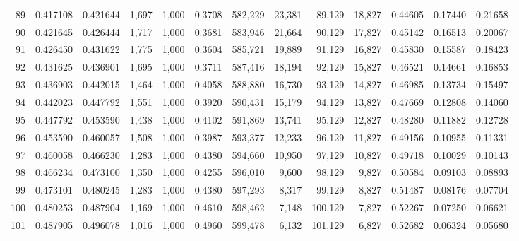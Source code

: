 \begin{tabular}{rrrrrrrrrrrrr}
89  &  0.417108 &  0.421644 &   1,697 &  1,000 &                                     0.3708 &  582,229 &   23,381 &   89,129 &   18,827 &  0.44605 &  0.17440 &  0.21658 \\
90  &  0.421645 &  0.426444 &   1,717 &  1,000 &                                     0.3681 &  583,946 &   21,664 &   90,129 &   17,827 &  0.45142 &  0.16513 &  0.20067 \\
91  &  0.426450 &  0.431622 &   1,775 &  1,000 &                                     0.3604 &  585,721 &   19,889 &   91,129 &   16,827 &  0.45830 &  0.15587 &  0.18423 \\
92  &  0.431625 &  0.436901 &   1,695 &  1,000 &                                     0.3711 &  587,416 &   18,194 &   92,129 &   15,827 &  0.46521 &  0.14661 &  0.16853 \\
93  &  0.436903 &  0.442015 &   1,464 &  1,000 &                                     0.4058 &  588,880 &   16,730 &   93,129 &   14,827 &  0.46985 &  0.13734 &  0.15497 \\
94  &  0.442023 &  0.447792 &   1,551 &  1,000 &                                     0.3920 &  590,431 &   15,179 &   94,129 &   13,827 &  0.47669 &  0.12808 &  0.14060 \\
95  &  0.447792 &  0.453590 &   1,438 &  1,000 &                                     0.4102 &  591,869 &   13,741 &   95,129 &   12,827 &  0.48280 &  0.11882 &  0.12728 \\
96  &  0.453590 &  0.460057 &   1,508 &  1,000 &                                     0.3987 &  593,377 &   12,233 &   96,129 &   11,827 &  0.49156 &  0.10955 &  0.11331 \\
97  &  0.460058 &  0.466230 &   1,283 &  1,000 &                                     0.4380 &  594,660 &   10,950 &   97,129 &   10,827 &  0.49718 &  0.10029 &  0.10143 \\
98  &  0.466234 &  0.473100 &   1,350 &  1,000 &                                     0.4255 &  596,010 &    9,600 &   98,129 &    9,827 &  0.50584 &  0.09103 &  0.08893 \\
99  &  0.473101 &  0.480245 &   1,283 &  1,000 &                                     0.4380 &  597,293 &    8,317 &   99,129 &    8,827 &  0.51487 &  0.08176 &  0.07704 \\
100 &  0.480253 &  0.487904 &   1,169 &  1,000 &                                     0.4610 &  598,462 &    7,148 &  100,129 &    7,827 &  0.52267 &  0.07250 &  0.06621 \\
101 &  0.487905 &  0.496078 &   1,016 &  1,000 &                                     0.4960 &  599,478 &    6,132 &  101,129 &    6,827 &  0.52682 &  0.06324 &  0.05680 \\

\end{tabular}
